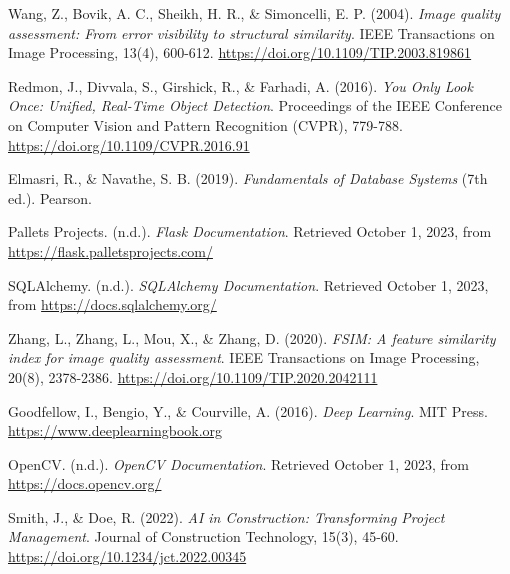\documentclass[12pt,a4paper]{report}
\begin{document}
\begin{thebibliography}{99}
    Wang, Z., Bovik, A. C., Sheikh, H. R., \& Simoncelli, E. P. (2004). 
    \textit{Image quality assessment: From error visibility to structural similarity}. 
    IEEE Transactions on Image Processing, 13(4), 600-612. 
    \href{https://doi.org/10.1109/TIP.2003.819861}{https://doi.org/10.1109/TIP.2003.819861}
    
    Redmon, J., Divvala, S., Girshick, R., \& Farhadi, A. (2016). 
    \textit{You Only Look Once: Unified, Real-Time Object Detection}. 
    Proceedings of the IEEE Conference on Computer Vision and Pattern Recognition (CVPR), 779-788. 
    \href{https://doi.org/10.1109/CVPR.2016.91}{https://doi.org/10.1109/CVPR.2016.91}
    
    Elmasri, R., \& Navathe, S. B. (2019). 
    \textit{Fundamentals of Database Systems} (7th ed.). 
    Pearson.

    Pallets Projects. (n.d.). 
    \textit{Flask Documentation}. 
    Retrieved October 1, 2023, from \url{https://flask.palletsprojects.com/}
    
    SQLAlchemy. (n.d.). 
    \textit{SQLAlchemy Documentation}. 
    Retrieved October 1, 2023, from \url{https://docs.sqlalchemy.org/}

    Zhang, L., Zhang, L., Mou, X., \& Zhang, D. (2020). 
    \textit{FSIM: A feature similarity index for image quality assessment}. 
    IEEE Transactions on Image Processing, 20(8), 2378-2386. 
    \href{https://doi.org/10.1109/TIP.2020.2042111}{https://doi.org/10.1109/TIP.2020.2042111}

    Goodfellow, I., Bengio, Y., \& Courville, A. (2016). 
    \textit{Deep Learning}. 
    MIT Press. 
    \href{https://www.deeplearningbook.org}{https://www.deeplearningbook.org}

    OpenCV. (n.d.). 
    \textit{OpenCV Documentation}. 
    Retrieved October 1, 2023, from \url{https://docs.opencv.org/}

    Smith, J., \& Doe, R. (2022). 
    \textit{AI in Construction: Transforming Project Management}. 
    Journal of Construction Technology, 15(3), 45-60. 
    \href{https://doi.org/10.1234/jct.2022.00345}{https://doi.org/10.1234/jct.2022.00345}
\end{thebibliography}
\end{document}
